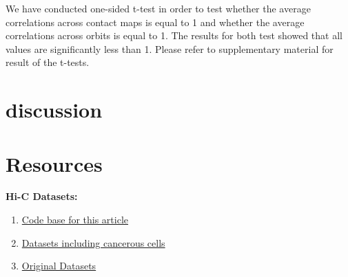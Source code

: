 \documentclass[a4,center,fleqn]{NAR}
\begin{document}
We have conducted one-sided
t-test in order to test whether the average correlations across
contact maps is equal to 1  and whether the average 
correlations across orbits is equal to 1. The results
for both test showed that all values are significantly less than 1.
Please refer to supplementary material for result of the t-tests.

\section{discussion}
\newpage
\section{Resources}
\textbf{Hi-C Datasets:}
\begin{enumerate}
    \item \href{https://github.com/rasoolianbehnam/watson}{Code base for this article}
    \item \href{http://sysbio.rnet.missouri.edu/T0510/tmp_download/link_to_download_genome_data/}
        {Datasets including cancerous cells}
    \item \href{https://bcm.app.box.com/v/aidenlab/folder/11234760671}{Original Datasets}
\end{enumerate}




\end{document}
